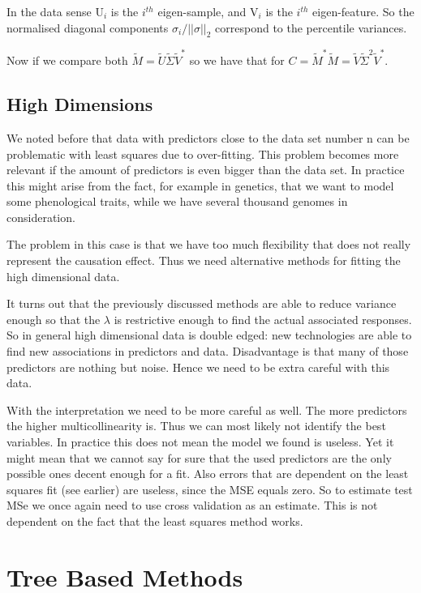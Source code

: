 \documentclass{article}
\begin{document}
 In the data sense $\text{U}_i$ is the $i^{th}$ eigen-sample, and $\text{V}_i$ is the $i^{th}$ eigen-feature. So the normalised diagonal components $\sigma_i / ||\sigma||_2$ correspond to the percentile variances. 
 
 Now if we compare both $\widetilde{ M} =\widetilde{ U} \widetilde{\Sigma} \widetilde{V}^*$ so we have that for $C=\widetilde{M}^* \widetilde{M} =\widetilde{ V} \widetilde{\Sigma}^2 \widetilde{V}^* $.

\subsection{High Dimensions}

We noted before that data with predictors close to the data set number n can be problematic with least squares due to over-fitting. This problem becomes more relevant if the amount of predictors is even bigger than the data set. In practice this might arise from the fact, for example in genetics, that we want to model some phenological traits, while we have several thousand genomes in consideration. 

The problem in this case is that we have too much flexibility that does not really represent the causation effect. Thus we need alternative methods for fitting the high dimensional data.

It turns out that the previously discussed methods are able to reduce variance enough so that the $\lambda$ is restrictive enough to find the actual associated responses. So in general high dimensional data is double edged: new technologies are able to find new associations in predictors and data. Disadvantage is that many of those predictors are nothing but noise. Hence we need to be extra careful with this data. 

With the interpretation we need to be more careful as well. The more predictors the higher multicollinearity is. Thus we can most likely not identify the best variables. In practice this does not mean the model we found is useless. Yet it might mean that we cannot say for sure that the used predictors are the only possible ones decent enough for a fit. Also errors that are dependent on the least squares fit (see earlier) are useless, since the MSE equals zero. So to estimate test MSe we once again need to use cross validation as an estimate. This is not dependent on the fact that the least squares method works. 

\newpage
\section{Tree Based Methods}
\end{document}
